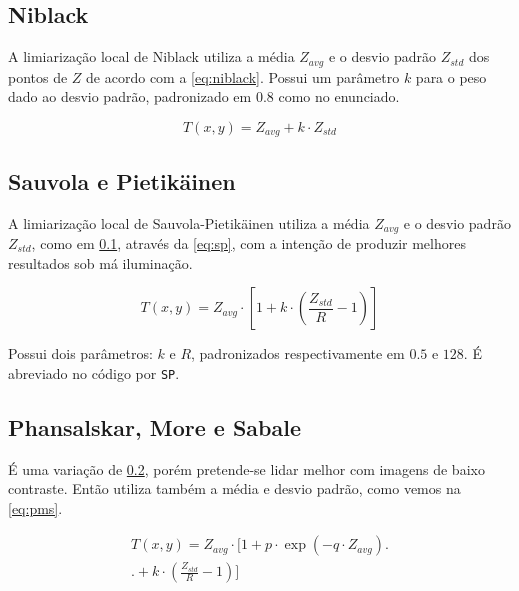 \documentclass[brazilian,a4paper,twocolumn]{article}
\begin{document}
    \subsection{Niblack}
    \label{sec:niblack}

        A limiarização local de Niblack utiliza a média $Z_{avg}$ e o desvio padrão $Z_{std}$ dos pontos de $Z$ de acordo com a \cref{eq:niblack}. Possui um parâmetro $k$ para o peso dado ao desvio padrão, padronizado em $0.8$ como no enunciado.

        \begin{equation}
        \label{eq:niblack}
            T(x, y) = Z_{avg} + k \cdot Z_{std}
        \end{equation}

    \subsection{Sauvola e Pietikäinen}
    \label{sec:sp}

        A limiarização local de Sauvola-Pietikäinen utiliza a média $Z_{avg}$ e o desvio padrão $Z_{std}$, como em \ref{sec:niblack}, através da \cref{eq:sp}, com a intenção de produzir melhores resultados sob má iluminação.

        \begin{equation}
        \label{eq:sp}
            T(x, y) = Z_{avg} \cdot \left[ 1 +  k \cdot \left( \frac{Z_{std}}{R} - 1\right) \right]
        \end{equation}

        Possui dois parâmetros: $k$ e $R$, padronizados respectivamente em $0.5$ e $128$. É abreviado no código por \texttt{SP}.

    \subsection{Phansalskar, More e Sabale}

        É uma variação de \ref{sec:sp}, porém pretende-se lidar melhor com imagens de baixo contraste. Então utiliza também a média e desvio padrão, como vemos na \cref{eq:pms}.

        \begin{multline}
        \label{eq:pms}
            T(x, y) = Z_{avg} \cdot \Biggl[ 1 +  p \cdot \exp{ \left( -q \cdot Z_{avg} \right) } \Biggr. \\ \Biggl. + k \cdot \left( \frac{Z_{std}}{R} - 1 \right) \Biggr]
        \end{multline}
\end{document}
